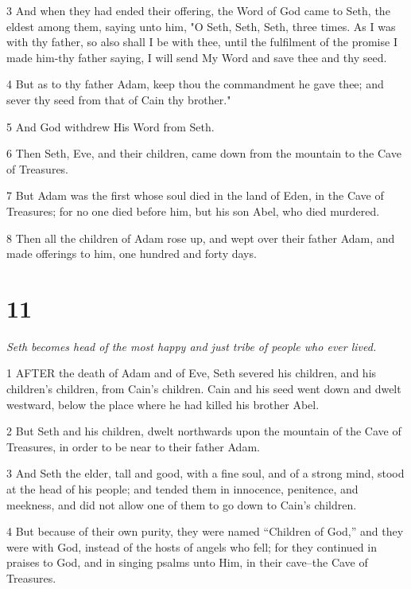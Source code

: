 \par 3 And when they had ended their offering, the Word of God came to Seth, the eldest among them, saying unto him, "O Seth, Seth, Seth, three times. As I was with thy father, so also shall I be with thee, until the fulfilment of the promise I made him-thy father saying, I will send My Word and save thee and thy seed.

\par 4 But as to thy father Adam, keep thou the commandment he gave thee; and sever thy seed from that of Cain thy brother."

\par 5 And God withdrew His Word from Seth.

\par 6 Then Seth, Eve, and their children, came down from the mountain to the Cave of Treasures.

\par 7 But Adam was the first whose soul died in the land of Eden, in the Cave of Treasures; for no one died before him, but his son Abel, who died murdered.

\par 8 Then all the children of Adam rose up, and wept over their father Adam, and made offerings to him, one hundred and forty days.

\chapter{11}

\par \textit{Seth becomes head of the most happy and just tribe of people who ever lived.}

\par 1 AFTER the death of Adam and of Eve, Seth severed his children, and his children's children, from Cain's children. Cain and his seed went down and dwelt westward, below the place where he had killed his brother Abel.

\par 2 But Seth and his children, dwelt northwards upon the mountain of the Cave of Treasures, in order to be near to their father Adam.

\par 3 And Seth the elder, tall and good, with a fine soul, and of a strong mind, stood at the head of his people; and tended them in innocence, penitence, and meekness, and did not allow one of them to go down to Cain's children.

\par 4 But because of their own purity, they were named “Children of God,” and they were with God, instead of the hosts of angels who fell; for they continued in praises to God, and in singing psalms unto Him, in their cave--the Cave of Treasures.

